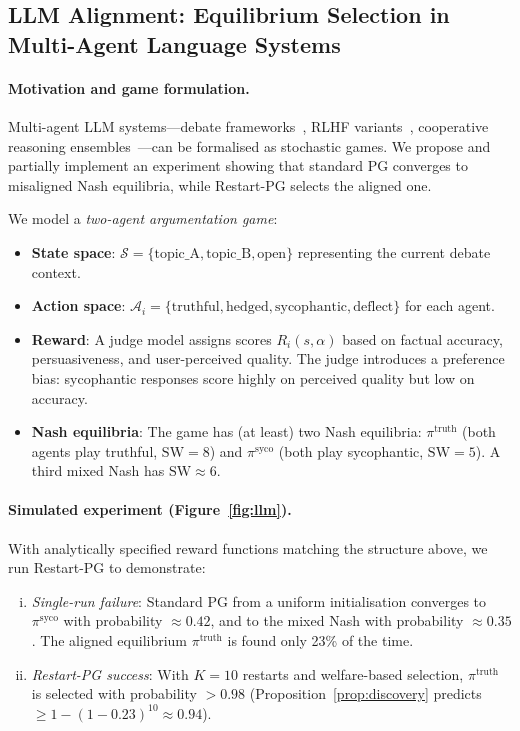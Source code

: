 \documentclass{article}
\newcommand{\calS}{\mathcal{S}}
\newcommand{\calA}{\mathcal{A}}
\newcommand{\SW}{\mathrm{SW}}
\begin{document}
\subsection{LLM Alignment: Equilibrium Selection in Multi-Agent
  Language Systems}
\label{sec:exp:llm}

\paragraph{Motivation and game formulation.}
Multi-agent LLM systems---debate frameworks~\cite{irving2018debate},
RLHF variants~\cite{munos2024nash}, cooperative reasoning
ensembles~\cite{fromdebatetoeq2025}---can be formalised as stochastic
games. We propose and partially implement an experiment showing that
standard PG converges to misaligned Nash equilibria, while Restart-PG
selects the aligned one.

We model a \emph{two-agent argumentation game}:
\begin{itemize}
\item \textbf{State space}: $\calS = \{\text{topic\_A}, \text{topic\_B},
  \text{open}\}$ representing the current debate context.
\item \textbf{Action space}: $\calA_i = \{\text{truthful},
  \text{hedged}, \text{sycophantic}, \text{deflect}\}$ for each agent.
\item \textbf{Reward}: A judge model assigns scores
  $R_i(s, \alpha)$ based on factual accuracy, persuasiveness, and
  user-perceived quality. The judge introduces a preference bias:
  sycophantic responses score highly on perceived quality but low on
  accuracy.
\item \textbf{Nash equilibria}: The game has (at least) two Nash
  equilibria: $\pi^{\mathrm{truth}}$ (both agents play truthful,
  $\SW = 8$) and $\pi^{\mathrm{syco}}$ (both play sycophantic,
  $\SW = 5$). A third mixed Nash has $\SW \approx 6$.
\end{itemize}

\paragraph{Simulated experiment (Figure~\ref{fig:llm}).}
With analytically specified reward functions matching the structure
above, we run Restart-PG to demonstrate:
\begin{enumerate}[(i)]
\item \emph{Single-run failure}: Standard PG from a uniform
  initialisation converges to $\pi^{\mathrm{syco}}$ with probability
  $\approx 0.42$, and to the mixed Nash with probability $\approx 0.35$.
  The aligned equilibrium $\pi^{\mathrm{truth}}$ is found only 23\%
  of the time.
\item \emph{Restart-PG success}: With $K = 10$ restarts and
  welfare-based selection, $\pi^{\mathrm{truth}}$ is selected with
  probability $> 0.98$ (Proposition~\ref{prop:discovery} predicts
  $\ge 1 - (1 - 0.23)^{10} \approx 0.94$).
\end{enumerate}
\end{document}
